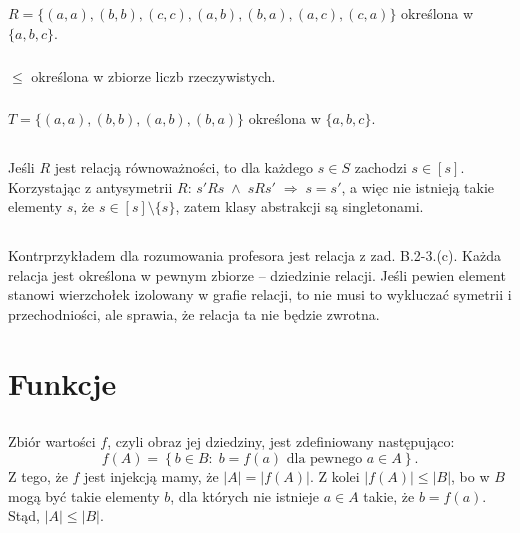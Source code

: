 \subsection{} %
\subsubsection{}
$R = \{(a,a),(b,b),(c,c),(a,b),(b,a),(a,c),(c,a)\}$ określona w $\{ a,b,c\}$.

\subsubsection{}
$\le$ określona w zbiorze liczb rzeczywistych.

\subsubsection{}
$T = \{(a,a),(b,b),(a,b),(b,a)\}$ określona w $\{ a,b,c\}$.

\subsection{} %
Jeśli $R$ jest relacją równoważności, to dla każdego $s\in S$ zachodzi $s\in[s]$. Korzystając z antysymetrii $R$: $s'Rs\;\wedge\;sRs'\;\Rightarrow\;s=s'$, a więc nie istnieją takie elementy $s$, że $s\in[s]\setminus\{ s\}$, zatem klasy abstrakcji są singletonami.

\subsection{} %
Kontrprzykładem dla rozumowania profesora jest relacja z zad. B.2-3.(c). Każda relacja jest określona w pewnym zbiorze -- dziedzinie relacji. Jeśli pewien element stanowi wierzchołek izolowany w grafie relacji, to nie musi to wykluczać symetrii i przechodniości, ale sprawia, że relacja ta nie będzie zwrotna.

\section{Funkcje}

\subsection{} %
\subsubsection{}
Zbiór wartości $f$, czyli obraz jej dziedziny, jest zdefiniowany następująco:
\[
	f(A) = \left\{ b\in B:\;b=f(a)\mbox{ dla pewnego }a\in A\right\}.
\]
Z tego, że $f$ jest injekcją mamy, że $|A|=|f(A)|$. Z kolei $|f(A)|\le |B|$, bo w $B$ mogą być takie elementy $b$, dla których nie istnieje $a\in A$ takie, że $b=f(a)$. Stąd, $|A|\le |B|$.


